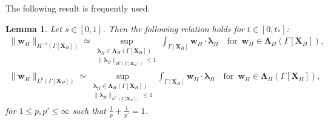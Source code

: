 \documentclass[11pt,reqno]{amsart}
\theoremstyle{definition}
\theoremstyle{plain}
\newtheorem{lemma}{Lemma}[section]
\numberwithin{theorem}{section}
\numberwithin{proposition}{section}
\numberwithin{lemma}{section}
\numberwithin{equation}{section}
\newcommand{\bs}[1]{\boldsymbol{#1}}
\renewcommand{\(}{\bigl(}
\renewcommand{\)}{\bigr)}
\begin{document}
The following result is frequently used. 
\begin{lemma}\label{Lemma-A-duality}
Let $s\in[0,1]$. Then the following relation holds for $t\in[0,t_*]$: 
\begin{align}
\|{\bs w}_H\|_{H^{-s}(\Gamma[{\bs X}_H])}
\simeq
\sup_{\substack{{\bs\lambda}_H\in {\bs\Lambda}_H(\Gamma[{\bs X}_H])\\ \|{\bs\lambda}_H\|_{H^{s}(\Gamma[{\bs X}_H])}\le 1}} \int_{\Gamma[{\bs X}_H]} {\bs w}_H\cdot {\bs\lambda}_H 
\quad\mbox{for}\,\,\,{\bs w}_H\in {\bs\Lambda}_H(\Gamma[{\bs X}_H]) ,\\
\|{\bs w}_H\|_{L^p(\Gamma[{\bs X}_H])}
\simeq
\sup_{\substack{{\bs\lambda}_H\in {\bs\Lambda}_H(\Gamma[{\bs X}_H])\\ \|{\bs\lambda}_H\|_{L^{p'}(\Gamma[{\bs X}_H])}\le 1}} \int_{\Gamma[{\bs X}_H]} {\bs w}_H\cdot {\bs\lambda}_H 
\quad\mbox{for}\,\,\,{\bs w}_H\in {\bs\Lambda}_H(\Gamma[{\bs X}_H]) ,
\end{align}
for $1\le p,p'\leq \infty$ such that $\frac{1}{p}+\frac{1}{p'}=1$.
\end{lemma}
\end{document}
